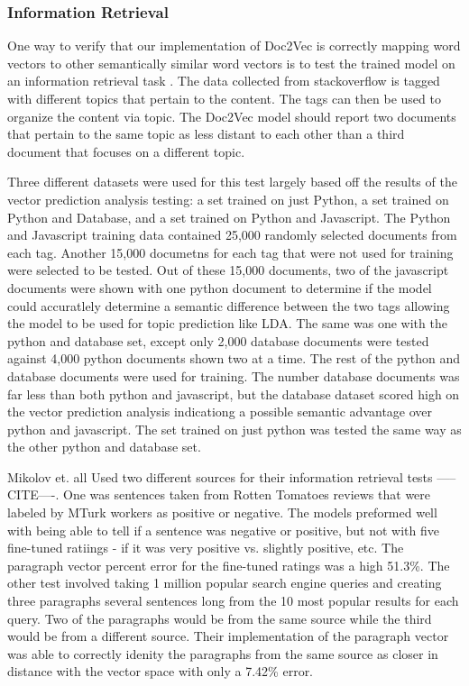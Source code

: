 \subsubsection{Information Retrieval}

One way to verify that our implementation of Doc2Vec is correctly mapping word vectors to other semantically similar word vectors is to test the trained model on an information retrieval task . \cite{RefWorks:doc:5a6e5746e4b0d609eec798d7} The data collected from stackoverflow is tagged with different topics that pertain to the content. The tags can then be used to organize the content via topic. The Doc2Vec model should report two documents that pertain to the same topic as less distant to each other than a third document that focuses on a different topic.

Three different datasets were used for this test largely based off the results of the vector prediction analysis testing: a set trained on just Python, a set trained on Python and Database, and a set trained on Python and Javascript. The Python and Javascript training data contained 25,000 randomly selected documents from each tag. Another 15,000 documetns for each tag that were not used for training were selected to be tested. Out of these 15,000 documents, two of the javascript documents were shown with one python document to determine if the model could accuratlely determine a semantic difference between the two tags allowing the model to be used for topic prediction like LDA. The same was one with the python and database set, except only 2,000 database documents were tested against 4,000 python documents shown two at a time. The rest of the python and database documents were used for training. The number database documents was far less than both python and javascript, but the database dataset scored high on the vector prediction analysis indicationg a possible semantic advantage over python and javascript. The set trained on just python was tested the same way as the other python and database set.

Mikolov et. all Used two different sources for their information retrieval tests -----CITE----. One was sentences taken from Rotten Tomatoes reviews that were labeled by MTurk workers as positive or negative. The models preformed well with being able to tell if a sentence was negative or positive, but not with five fine-tuned ratiings - if it was very positive vs. slightly positive, etc. The paragraph vector percent error for the fine-tuned ratings was a high 51.3\%. The other test involved taking 1 million popular search engine queries and creating three paragraphs several sentences long from the 10 most popular results for each query. Two of the paragraphs would be from the same source while the third would be from a different source. Their implementation of the paragraph vector was able to correctly idenity the paragraphs from the same source as closer in distance with the vector space with only a 7.42\% error. 

